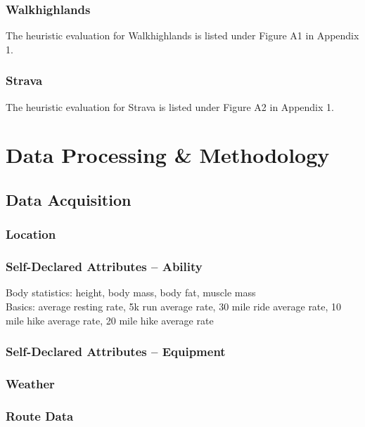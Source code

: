 \documentclass[11pt, english]{article}
\begin{document}
		\subsubsection{Walkhighlands}

	The heuristic evaluation for Walkhighlands is listed under Figure A1 in Appendix 1.

		\subsubsection{Strava}

	The heuristic evaluation for Strava is listed under Figure A2 in Appendix 1.

\newpage

\section{Data Processing \& Methodology}\label{ch3}

	\subsection{Data Acquisition}

		\subsubsection{Location}

		\subsubsection{Self-Declared Attributes -- Ability}

		Body statistics: height, body mass, body fat, muscle mass\\

		Basics: average resting rate, 5k run average rate, 30 mile ride average rate, 10 mile hike average rate, 20 mile hike average rate

		\subsubsection{Self-Declared Attributes -- Equipment}

		\subsubsection{Weather}

		\subsubsection{Route Data}
\end{document}
